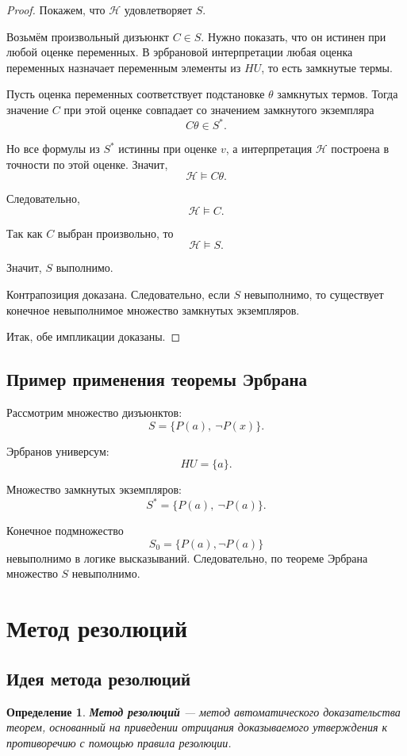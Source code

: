 \documentclass[12pt,a4paper]{article}
\newtheorem{definition}{Определение}
\begin{document}
\begin{proof}
Покажем, что $\mathcal{H}$ удовлетворяет $S$.

Возьмём произвольный дизъюнкт $C \in S$. Нужно показать, что он истинен при любой оценке переменных. В эрбрановой интерпретации любая оценка переменных назначает переменным элементы из $HU$, то есть замкнутые термы.

Пусть оценка переменных соответствует подстановке $\theta$ замкнутых термов. Тогда значение $C$ при этой оценке совпадает со значением замкнутого экземпляра
$$
C\theta \in S^*.
$$

Но все формулы из $S^*$ истинны при оценке $v$, а интерпретация $\mathcal{H}$ построена в точности по этой оценке. Значит,
$$
\mathcal{H} \models C\theta.
$$

Следовательно,
$$
\mathcal{H} \models C.
$$

Так как $C$ выбран произвольно, то
$$
\mathcal{H} \models S.
$$

Значит, $S$ выполнимо.

Контрапозиция доказана. Следовательно, если $S$ невыполнимо, то существует конечное невыполнимое множество замкнутых экземпляров.

Итак, обе импликации доказаны.
\end{proof}

\subsection{Пример применения теоремы Эрбрана}

Рассмотрим множество дизъюнктов:
$$
S = \{P(a),\ \neg P(x)\}.
$$

Эрбранов универсум:
$$
HU = \{a\}.
$$

Множество замкнутых экземпляров:
$$
S^* = \{P(a),\ \neg P(a)\}.
$$

Конечное подмножество
$$
S_0 = \{P(a),\neg P(a)\}
$$
невыполнимо в логике высказываний. Следовательно, по теореме Эрбрана множество $S$ невыполнимо.

\section{Метод резолюций}

\subsection{Идея метода резолюций}

\begin{definition}
\textbf{Метод резолюций} --- метод автоматического доказательства теорем, основанный на приведении отрицания доказываемого утверждения к противоречию с помощью правила резолюции.
\end{definition}
\end{document}
